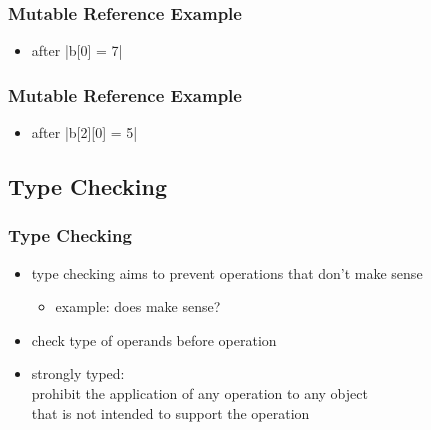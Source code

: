 \documentclass[dvipsnames]{beamer}
\theoremstyle{plain}
\begin{document}
\begin{frame}
  \frametitle{Mutable Reference Example}

  \begin{itemize}
    \item after \pyv|b[0] = 7|
  \end{itemize}

  \begin{center}
  \end{center}
\end{frame}

\begin{frame}
  \frametitle{Mutable Reference Example}

  \begin{itemize}
    \item after \pyv|b[2][0] = 5|
  \end{itemize}

  \begin{center}
  \end{center}
\end{frame}

\subsection{Type Checking}

\begin{frame}
  \frametitle{Type Checking}

  \begin{itemize}
    \item type checking aims to prevent operations that don't make sense
    \begin{itemize}
      \item example: does  make sense?
    \end{itemize}
    \item check type of operands before operation

    \pause
    \medskip
    \item \alert{strongly typed}:\\
      prohibit the application of any operation to any object\\
      that is not intended to support the operation
  \end{itemize}
\end{frame}
\end{document}

